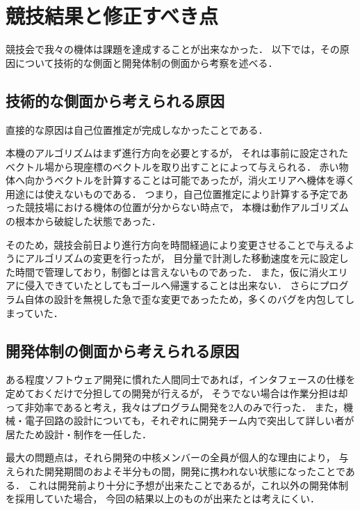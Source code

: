 \documentclass[11pt,a4]{jsarticle}
\begin{document}
\section{競技結果と修正すべき点}  %

  競技会で我々の機体は課題を達成することが出来なかった．
  以下では，その原因について技術的な側面と開発体制の側面から考察を述べる．

  \subsection{技術的な側面から考えられる原因}
    直接的な原因は自己位置推定が完成しなかったことである．

    本機のアルゴリズムはまず進行方向を必要とするが，
    それは事前に設定されたベクトル場から現座標のベクトルを取り出すことによって与えられる．
    赤い物体へ向かうベクトルを計算することは可能であったが，消火エリアへ機体を導く用途には使えないものである．
    つまり，自己位置推定により計算する予定であった競技場における機体の位置が分からない時点で，
    本機は動作アルゴリズムの根本から破綻した状態であった．

    そのため，競技会前日より進行方向を時間経過により変更させることで与えるようにアルゴリズムの変更を行ったが，
    目分量で計測した移動速度を元に設定した時間で管理しており，制御とは言えないものであった．
    また，仮に消火エリアに侵入できていたとしてもゴールへ帰還することは出来ない．
    さらにプログラム自体の設計を無視した急で歪な変更であったため，多くのバグを内包してしまっていた．

  \subsection{開発体制の側面から考えられる原因} %
    ある程度ソフトウェア開発に慣れた人間同士であれば，インタフェースの仕様を定めておくだけで分担しての開発が行えるが，
    そうでない場合は作業分担は却って非効率であると考え，我々はプログラム開発を2人のみで行った．
    また，機械・電子回路の設計についても，それぞれに開発チーム内で突出して詳しい者が居たため設計・制作を一任した．

    最大の問題点は，それら開発の中核メンバーの全員が個人的な理由により，
    与えられた開発期間のおよそ半分もの間，開発に携われない状態になったことである．
    これは開発前より十分に予想が出来たことであるが，これ以外の開発体制を採用していた場合，
    今回の結果以上のものが出来たとは考えにくい．
\end{document}
